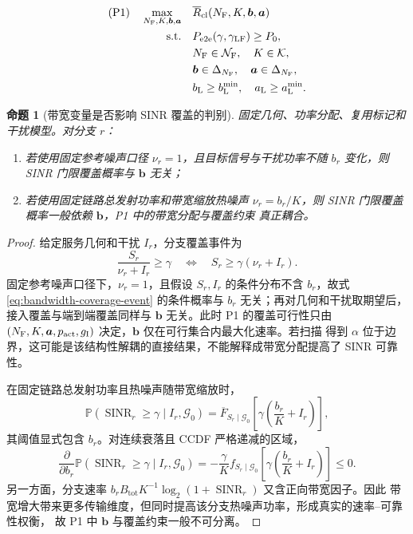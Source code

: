 \documentclass[UTF8,a4paper,11pt]{ctexart}
\newtheorem{proposition}{命题}[section]
\newcommand{\Prob}{\mathbb P}
\newcommand{\NF}{N_{\mathrm F}}
\newcommand{\SINR}{\operatorname{SINR}}
\newcommand{\Btot}{B_{\mathrm{tot}}}
\newcommand{\Pe}{P_{\mathrm{e2e}}}
\newcommand{\Rbar}{\overline R}
\newcommand{\bvec}{\bm b}
\newcommand{\avec}{\bm a}
\newcommand{\Gvec}{\bm{\mathcal G}}
\newcommand{\Simplex}{\Delta}
\begin{document}
\begin{equation}
\begin{aligned}
 \mathrm{(P1)}\quad
 \max_{\NF,K,\bvec,\avec}\quad
 &\Rbar_{\rm cl}(\NF,K,\bvec,\avec)\\
 \text{s.t.}\quad
 &\Pe(\gamma,\gamma_{\rm LF})\geq P_0,\\
 &\NF\in\mathcal N_{\rm F},\quad K\in\mathcal K,\\
 &\bvec\in\Simplex_{\NF},\quad\avec\in\Simplex_{\NF},\\
 &b_{\rm L}\geq b_{\rm L}^{\min},
 \quad a_{\rm L}\geq a_{\rm L}^{\min}.
\end{aligned}
\label{eq:p1}
\end{equation}

\begin{proposition}[带宽变量是否影响 SINR 覆盖的判别]
\label{prop:bandwidth-coverage-coupling}
固定几何、功率分配、复用标记和干扰模型。对分支 $r$：
\begin{enumerate}[leftmargin=2em]
  \item 若使用固定参考噪声口径 $\nu_r=1$，且目标信号与干扰功率不随 $b_r$ 变化，则
  SINR 门限覆盖概率与 $\bvec$ 无关；
  \item 若使用固定链路总发射功率和带宽缩放热噪声
  $\nu_r=b_r/K$，则 SINR 门限覆盖概率一般依赖 $\bvec$，P1 中的带宽分配与覆盖约束
  真正耦合。
\end{enumerate}
\end{proposition}

\begin{proof}
给定服务几何和干扰 $I_r$，分支覆盖事件为
\begin{equation}
 \frac{S_r}{\nu_r+I_r}\geq\gamma
 \quad\Longleftrightarrow\quad
 S_r\geq\gamma(\nu_r+I_r).
 \label{eq:bandwidth-coverage-event}
\end{equation}
固定参考噪声口径下，$\nu_r=1$，且假设 $S_r,I_r$ 的条件分布不含 $b_r$，故式
\eqref{eq:bandwidth-coverage-event} 的条件概率与 $b_r$ 无关；再对几何和干扰取期望后，
接入覆盖与端到端覆盖同样与 $\bvec$ 无关。此时 P1 的覆盖可行性只由
$(\NF,K,\avec,p_{\rm act},g_{\rm I})$ 决定，$\bvec$ 仅在可行集合内最大化速率。若扫描
得到 $\alpha$ 位于边界，这可能是该结构性解耦的直接结果，不能解释成带宽分配提高了
SINR 可靠性。

在固定链路总发射功率且热噪声随带宽缩放时，
\begin{equation}
 \Prob(\SINR_r\geq\gamma\mid I_r,\Gvec_0)
 =
 \overline F_{S_r\mid\Gvec_0}
 \left[
 \gamma\left(\frac{b_r}{K}+I_r\right)
 \right],
 \label{eq:bandwidth-coupled-success}
\end{equation}
其阈值显式包含 $b_r$。对连续衰落且 CCDF 严格递减的区域，
\begin{equation}
 \frac{\partial}{\partial b_r}
 \Prob(\SINR_r\geq\gamma\mid I_r,\Gvec_0)
 =
 -\frac{\gamma}{K}
 f_{S_r\mid\Gvec_0}
 \left[
 \gamma\left(\frac{b_r}{K}+I_r\right)
 \right]
 \leq0.
 \label{eq:bandwidth-coverage-derivative}
\end{equation}
另一方面，分支速率 $b_r\Btot K^{-1}\log_2(1+\SINR_r)$ 又含正向带宽因子。因此
带宽增大带来更多传输维度，但同时提高该分支热噪声功率，形成真实的速率--可靠性权衡，
故 P1 中 $\bvec$ 与覆盖约束一般不可分离。
\end{proof}
\end{document}
